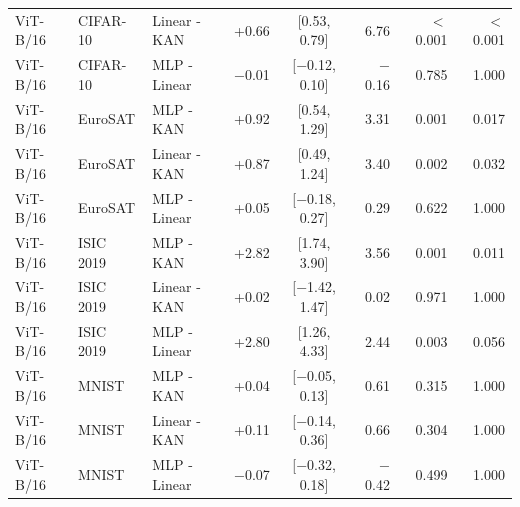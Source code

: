 \documentclass[10pt]{article}
\begin{document}
\begin{longtable}{lllrcrrr}
ViT-B/16 & CIFAR-10 & Linear - KAN & +0.66 & [0.53, 0.79] & 6.76 & $<$0.001 & $<$0.001 \\
ViT-B/16 & CIFAR-10 & MLP - Linear & $-$0.01 & [$-$0.12, 0.10] & $-$0.16 & 0.785 & 1.000 \\
ViT-B/16 & EuroSAT & MLP - KAN & +0.92 & [0.54, 1.29] & 3.31 & 0.001 & 0.017 \\
ViT-B/16 & EuroSAT & Linear - KAN & +0.87 & [0.49, 1.24] & 3.40 & 0.002 & 0.032 \\
ViT-B/16 & EuroSAT & MLP - Linear & +0.05 & [$-$0.18, 0.27] & 0.29 & 0.622 & 1.000 \\
ViT-B/16 & ISIC 2019 & MLP - KAN & +2.82 & [1.74, 3.90] & 3.56 & 0.001 & 0.011 \\
ViT-B/16 & ISIC 2019 & Linear - KAN & +0.02 & [$-$1.42, 1.47] & 0.02 & 0.971 & 1.000 \\
ViT-B/16 & ISIC 2019 & MLP - Linear & +2.80 & [1.26, 4.33] & 2.44 & 0.003 & 0.056 \\
ViT-B/16 & MNIST & MLP - KAN & +0.04 & [$-$0.05, 0.13] & 0.61 & 0.315 & 1.000 \\
ViT-B/16 & MNIST & Linear - KAN & +0.11 & [$-$0.14, 0.36] & 0.66 & 0.304 & 1.000 \\
ViT-B/16 & MNIST & MLP - Linear & $-$0.07 & [$-$0.32, 0.18] & $-$0.42 & 0.499 & 1.000 \\
\end{longtable}
\normalsize
\end{document}
